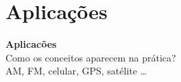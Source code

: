 \documentclass[aspectratio=169]{beamer}
\begin{document}
\section{Aplicações}

{
\begin{frame}[plain,c]
\begin{center}
{\Huge\textbf{Aplicac\~{o}es}}\\[0.8cm]
{\LARGE Como os conceitos aparecem na pr\'{a}tica?}\\[0.5cm]
{\large AM, FM, celular, GPS, satélite \ldots}
\end{center}
\end{frame}
}
\end{document}
